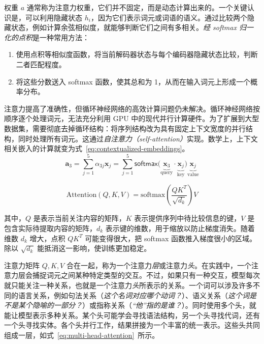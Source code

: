 权重 $a$ 通常称为注意力权重，它们并不固定，而是动态计算出来的。一个关键认识是，可以利用隐藏状态 $h_i$，因为它们表示词元或词语的语义。通过比较两个隐藏状态，例如计算余弦相似度，就能够判断它们之间有多相关。{\em 经 softmax 归一化的点积}是一种常用方法：
\begin{enumerate}
    \item 使用点积等相似度函数，将当前解码器状态与每个编码器隐藏状态比较，判断二者匹配程度。
    \item 将这些分数送入 softmax 函数，使其总和为 1，从而在输入词元上形成一个概率分布。
\end{enumerate}
注意力提高了准确性，但循环神经网络的高效计算问题仍未解决。循环神经网络按顺序逐个处理词元，无法充分利用 GPU 中的现代并行计算硬件。为了扩展到大型数据集，需要彻底去掉循环结构：将序列结构改为具有固定上下文宽度的并行结构，同时处理所有词元。这通过\textit{自注意力（self-attention）}实现。数学上，上下文相关嵌入的计算就变为式~\ref{eq:contextualized-embeddings}。
\begin{equation}
\label{eq:contextualized-embeddings}
    \mathbf{a}_3 = \sum_{j=1}^{5} \alpha_{3j} \mathbf{x}_j = \sum_{j=1}^{5} \textsf{softmax}{(\underbrace{\mathbf{x}_3}_{\text{query}} \cdot \underbrace{\mathbf{x}_j}_{\text{key}}}) \underbrace{\mathbf{x}_j}_{\text{value}}
\end{equation}

\begin{equation}
\label{eq:attention}
    \text{Attention}(Q, K, V) = \text{softmax}\left(\frac{QK^T}{\sqrt{d_k}}\right)V
\end{equation}

其中，$Q$ 是表示当前关注内容的矩阵，$K$ 表示提供序列中待比较信息的键，$V$ 是包含实际待提取内容的矩阵，$d_k$ 表示键的维数，用于缩放以防止梯度消失。随着维数 $d_k$ 增大，点积 $QK^T$ 可能变得很大，把 softmax 函数推入梯度很小的区域。除以 $\sqrt{d_k}$ 能抵消这一影响，使训练更加稳定。

注意力矩阵 $Q,K,V$ 合在一起，称为一个注意力{\em 层}或注意力{\em 头}。在实践中，一个注意力层会捕捉词元之间某种特定类型的交互。不过，如果只有一种交互，模型每次就只能关注一种关系，也就是一个注意力{\em 头}所表示的关系。一个词可以涉及许多不同的语言关系，例如句法关系（{\em 这个名词对应哪个动词？}）、语义关系（{\em 这个词是不是某个隐喻的一部分？}）或指称关系（{\em “他”指的是谁？}）。同时使用多个头，就能让模型表示多种关系。某个头可能学会寻找语法结构，另一个头寻找代词，还有一个头寻找实体。各个头并行工作，结果拼接为一个丰富的统一表示。这些头共同组成一层，如式~\ref{eq:multi-head-attention}~所示。

